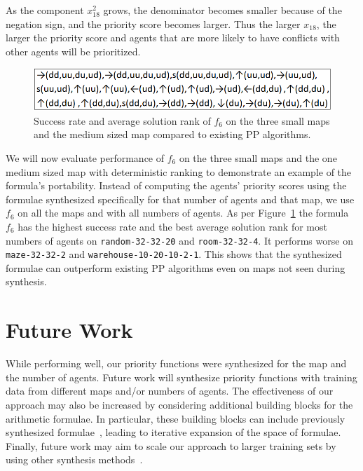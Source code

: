 \documentclass[letterpaper]{article}
\begin{document}
As the component $ x_{18}^2 $ grows, the denominator becomes smaller because of the negation sign, and the priority score becomes larger. Thus the larger $ x_{18} $, the larger the priority score and agents that are more likely to have conflicts with other agents will be prioritized.

\begin{figure}[t!]
\centering
\includegraphics[width=1.0\columnwidth]{figs/succRankPortability.png}
\caption{Success rate and average solution rank of $ f_{6} $ on the three small maps and the medium sized map compared to existing PP algorithms.}
\label{fig:portability}
\end{figure}

We will now evaluate performance of $ f_{6} $ on the three small maps and the one medium sized map with deterministic ranking to demonstrate an example of the formula's portability. Instead of computing the agents' priority scores using the formulae synthesized specifically for that number of agents and that map, we use $ f_6 $ on all the maps and with all numbers of agents. As per Figure~\ref{fig:portability} the formula $ f_6 $ has the highest success rate and the best average solution rank for most numbers of agents on {\tt random-32-32-20} and {\tt room-32-32-4}. It performs worse on {\tt maze-32-32-2} and {\tt warehouse-10-20-10-2-1}. This shows that the synthesized formulae can outperform existing PP algorithms even on maps not seen during synthesis.

\section{Future Work}

While performing well, our priority functions were synthesized for the map and the number of agents. Future work will synthesize priority functions with training data from different maps and/or numbers of agents. The effectiveness of our approach may also be increased by considering additional building blocks for the arithmetic formulae. In particular, these building blocks can include previously synthesized formulae~\cite{bulitko2022portability}, leading to iterative expansion of the space of formulae. Finally, future work may aim to scale our approach to larger training sets by using other synthesis methods~\citep{shah2022near,mapElites,Gallotta_2022,FI2Pop}.
\end{document}
